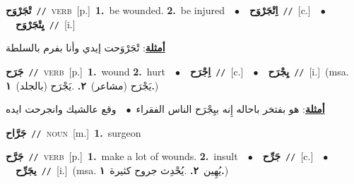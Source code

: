 \documentclass[10pt,a4paper,twoside]{article} %
\begin{document}
\begin{multicols}{2}
{\setlength\topsep{0pt}\textbf{\foreignlanguage{arabic}{تْجَرْوَح}}\ {\color{gray}\texttt{//}\color{black}}\ \textsc{verb}\ [p.]\ \textbf{1.}~be wounded.  \textbf{2.}~be injured\ \ $\bullet$\ \ \setlength\topsep{0pt}\textbf{\foreignlanguage{arabic}{اِتْجَرْوَح}}\ {\color{gray}\texttt{//}\color{black}}\ [c.]\ \ $\bullet$\ \ \setlength\topsep{0pt}\textbf{\foreignlanguage{arabic}{يِتْجَرْوَح}}\ {\color{gray}\texttt{//}\color{black}}\ [i.]\  \begin{flushright}\color{gray}\foreignlanguage{arabic}{\textbf{\underline{\foreignlanguage{arabic}{أمثلة}}}: تْجَرْوَحت إيدي وأنا بفرم بالسلطة}\end{flushright}\color{black}} \vspace{2mm}

{\setlength\topsep{0pt}\textbf{\foreignlanguage{arabic}{جَرَح}}\ {\color{gray}\texttt{//}\color{black}}\ \textsc{verb}\ [p.]\ \textbf{1.}~wound  \textbf{2.}~hurt\ \ $\bullet$\ \ \setlength\topsep{0pt}\textbf{\foreignlanguage{arabic}{اِجْرَح}}\ {\color{gray}\texttt{//}\color{black}}\ [c.]\ \ $\bullet$\ \ \setlength\topsep{0pt}\textbf{\foreignlanguage{arabic}{يِجْرَح}}\ {\color{gray}\texttt{//}\color{black}}\ [i.]\ \color{gray}(msa. \foreignlanguage{arabic}{يَجْرَح (مشاعر)}~\foreignlanguage{arabic}{\textbf{٢.}}  .\foreignlanguage{arabic}{يَجْرَح (بالجلد)}~\foreignlanguage{arabic}{\textbf{١.}})\color{black}\  \begin{flushright}\color{gray}\foreignlanguage{arabic}{\textbf{\underline{\foreignlanguage{arabic}{أمثلة}}}: هو بفتخر باحاله إِنه بيِجْرَح الناس الفقراء\ $\bullet$\ \  وقع عالشيك وانجرحت ايده}\end{flushright}\color{black}} \vspace{2mm}

{\setlength\topsep{0pt}\textbf{\foreignlanguage{arabic}{جَرَّاح}}\ {\color{gray}\texttt{//}\color{black}}\ \textsc{noun}\ [m.]\ \textbf{1.}~surgeon\ } \vspace{2mm}

{\setlength\topsep{0pt}\textbf{\foreignlanguage{arabic}{جَرَّح}}\ {\color{gray}\texttt{//}\color{black}}\ \textsc{verb}\ [p.]\ \textbf{1.}~make a lot of wounds.  \textbf{2.}~insult\ \ $\bullet$\ \ \setlength\topsep{0pt}\textbf{\foreignlanguage{arabic}{جَرِّح}}\ {\color{gray}\texttt{//}\color{black}}\ [c.]\ \ $\bullet$\ \ \setlength\topsep{0pt}\textbf{\foreignlanguage{arabic}{يجَرِّح}}\ {\color{gray}\texttt{//}\color{black}}\ [i.]\ \color{gray}(msa. \foreignlanguage{arabic}{يُهِين}~\foreignlanguage{arabic}{\textbf{٢.}}  .\foreignlanguage{arabic}{يُحْدِث جروح كثيرة}~\foreignlanguage{arabic}{\textbf{١.}})\color{black}\ } \vspace{2mm}


\end{multicols}
\end{document}
